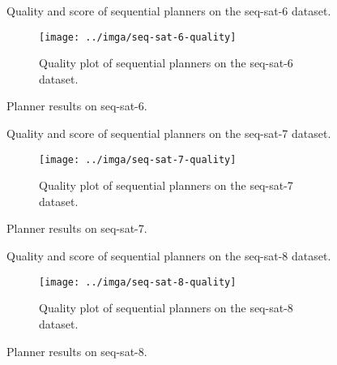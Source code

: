 \begin{figure}[tbp]
\centering
\begin{subtable}{\textwidth}
\centering
\scriptsize
\renewcommand{\footnotesize}{\scriptsize}

\caption{Quality and score of sequential planners on the seq-sat-6 dataset.}
\label{tab:seq-sat-6-ipc-scores}
\end{subtable}

\vspace{0.5cm}
\begin{subfigure}{\textwidth}
\centering
\texttt{[image: ../imga/seq-sat-6-quality]}
\caption{Quality plot of sequential planners on the seq-sat-6 dataset.}
\label{fig:seq-sat-6-quality}
\end{subfigure}
\caption{Planner results on seq-sat-6.}
\label{fig:seq-sat-6-results}
\end{figure}

\begin{figure}[tbp]
\centering
\begin{subtable}{\textwidth}
\centering
\scriptsize
\renewcommand{\footnotesize}{\scriptsize}

\caption{Quality and score of sequential planners on the seq-sat-7 dataset.}
\label{tab:seq-sat-7-ipc-scores}
\end{subtable}

\vspace{0.5cm}
\begin{subfigure}{\textwidth}
\centering
\texttt{[image: ../imga/seq-sat-7-quality]}
\caption{Quality plot of sequential planners on the seq-sat-7 dataset.}
\label{fig:seq-sat-7-quality}
\end{subfigure}
\caption{Planner results on seq-sat-7.}
\label{fig:seq-sat-7-results}
\end{figure}

\begin{figure}[tbp]
\centering
\begin{subtable}{\textwidth}
\centering
\scriptsize
\renewcommand{\footnotesize}{\scriptsize}

\caption{Quality and score of sequential planners on the seq-sat-8 dataset.}
\label{tab:seq-sat-8-ipc-scores}
\end{subtable}

\vspace{0.5cm}
\begin{subfigure}{\textwidth}
\centering
\texttt{[image: ../imga/seq-sat-8-quality]}
\caption{Quality plot of sequential planners on the seq-sat-8 dataset.}
\label{fig:seq-sat-8-quality}
\end{subfigure}
\caption{Planner results on seq-sat-8.}
\label{fig:seq-sat-8-results}
\end{figure}

